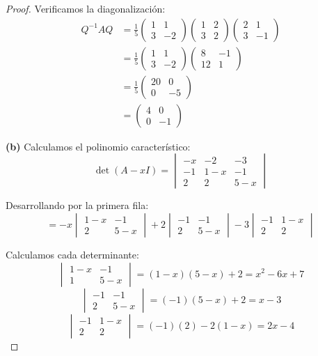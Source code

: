 \documentclass[11pt]{article}
\begin{document}
\begin{proof}
Verificamos la diagonalización:
\begin{align*}
    Q^{-1}AQ &=\frac{1}{5}\begin{pmatrix} 1 & 1 \\ 3 & -2 \end{pmatrix}\begin{pmatrix} 1 & 2 \\ 3 & 2 \end{pmatrix}\begin{pmatrix} 2 & 1 \\ 3 & -1 \end{pmatrix} \\
    &=\frac{1}{5}\begin{pmatrix}1&1\\3&-2\end{pmatrix} \begin{pmatrix}8 & -1 \\ 12 & 1 \end{pmatrix} \\
    &=\frac{1}{5}\begin{pmatrix}20 & 0 \\ 0 & -5 \end{pmatrix} \\
    &=\begin{pmatrix} 4 & 0 \\ 0 & -1 \end{pmatrix}
\end{align*}

    \textbf{(b)} Calculamos el polinomio característico:
\[
\det(A - x I) =\begin{vmatrix} -x & -2 & -3 \\ -1 & 1-x & -1 \\ 2 & 2 & 5-x \end{vmatrix}
\]

Desarrollando por la primera fila:
\[
= -x \begin{vmatrix} 1-x & -1 \\ 2 & 5-x \end{vmatrix} 
+ 2  \begin{vmatrix} -1 & -1 \\ 2 & 5-x \end{vmatrix} 
- 3  \begin{vmatrix} -1 & 1-x \\ 2 & 2 \end{vmatrix}
\]

Calculamos cada determinante:
\[
\begin{vmatrix} 1-x & -1 \\ 1 & 5-x \end{vmatrix} = (1-x)(5-x) + 2 = x^2 - 6x + 7
\]
\[
\begin{vmatrix} -1 & -1 \\ 2 & 5-x \end{vmatrix} = (-1)(5-x) + 2 = x - 3
\]
\[
\begin{vmatrix} -1 & 1-x \\ 2 & 2 \end{vmatrix} = (-1)(2) - 2(1-x) =2x-4
\]


\end{proof}
\end{document}
